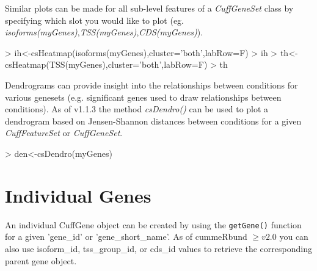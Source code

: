 \documentclass[10pt]{article}
\newcommand{\Rfunction}[1]{\texttt{#1}}
\newcommand{\Rclass}[1]{{\textit{#1}}}
\newcommand{\Rmethod}[1]{{\textit{#1}}}
\newcommand{\Rfunarg}[1]{{\textit{#1}}}
\begin{document}
Similar plots can be made for all sub-level features of a \Rclass{CuffGeneSet} class by specifying which slot you would like to plot (eg. \Rfunarg{isoforms(myGenes)},\Rfunarg{TSS(myGenes)},\Rfunarg{CDS(myGenes)}).

\begin{Schunk}
\begin{Sinput}
> ih<-csHeatmap(isoforms(myGenes),cluster='both',labRow=F)
> ih
> th<-csHeatmap(TSS(myGenes),cluster='both',labRow=F)
> th
\end{Sinput}
\end{Schunk}
\begin{figure}[htp]
	\begin{center}
		\qquad
	
	\end{center}
\end{figure}

Dendrograms can provide insight into the relationships between conditions for various genesets (e.g. significant genes used to draw relationships between conditions). As of v1.1.3 the method \Rmethod{csDendro()}
can be used to plot a dendrogram based on Jensen-Shannon distances between conditions for a given \Rclass{CuffFeatureSet} or \Rclass{CuffGeneSet}.
\begin{Schunk}
\begin{Sinput}
> den<-csDendro(myGenes)
\end{Sinput}
\end{Schunk}
\begin{figure}[htp]
	\begin{center}
	
	\end{center}
\end{figure}

\clearpage

\section{Individual Genes}
An individual CuffGene object can be created by using the \Rfunction{getGene()} function for a given 'gene\_id' or 'gene\_short\_name'. As of cummeRbund $\ge v2.0$ you can also use isoform\_id, tss\_group\_id, or
cds\_id values to retrieve the corresponding parent gene object.
\end{document}
